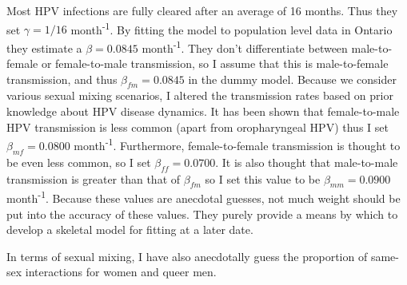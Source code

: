 \documentclass[12pt]{article}
\begin{document}
Most HPV infections are fully cleared after an average of 16 months.  Thus they set $\gamma=1/16$ month\textsuperscript{-1}.  By fitting the model to population level data in Ontario they estimate a $\beta=0.0845$ month\textsuperscript{-1}.  They don't differentiate between male-to-female or female-to-male transmission, so I assume that this is male-to-female transmission, and thus $\beta_{fm}=0.0845$ in the dummy model.  Because we consider various sexual mixing scenarios, I altered the transmission rates based on prior knowledge about HPV disease dynamics.  It has been shown that female-to-male HPV transmission is less common (apart from oropharyngeal HPV) thus I set $\beta_{mf}=0.0800$ month\textsuperscript{-1}.  Furthermore, female-to-female transmission is thought to be even less common, so I set $\beta_{ff}=0.0700$.  It is also thought that male-to-male transmission is greater than that of $\beta_{fm}$ so I set this value to be $\beta_{mm}=0.0900$ month\textsuperscript{-1}.  Because these values are anecdotal guesses, not much weight should be put into the accuracy of these values.  They purely provide a means by which to develop a skeletal model for fitting at a later date. 

In terms of sexual mixing, I have also anecdotally guess the proportion of same-sex interactions for women and queer men. 
\end{document}
